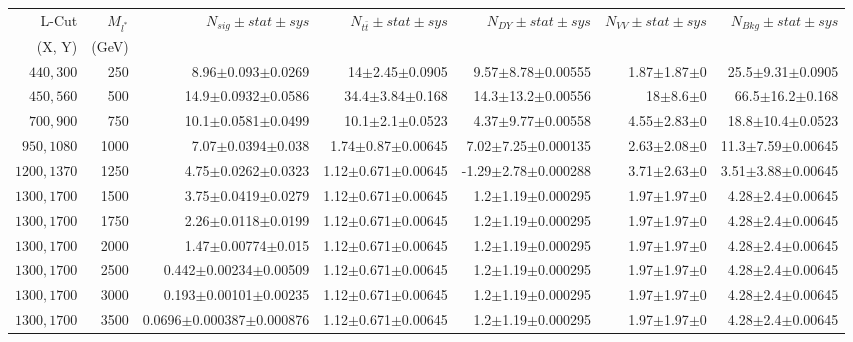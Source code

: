 \documentclass[]{article}
\begin{document}
\begin{table}
\begin{center}
\scriptsize{
\begin{tabular}{ |r|r|r|r|r|r|r|}
\hline 
L-Cut & $M_{l^*}$ & $N_{sig}\pm stat \pm sys $ &$N_{t\bar{t}}\pm stat \pm sys $ & $N_{DY}\pm stat \pm sys $ & $N_{VV}\pm stat \pm sys $ &$N_{Bkg}\pm stat \pm sys$\\
(X, Y) & (GeV) & && &&\\
\hline 
$440, 300$ & 250 & 8.96$\pm$0.093$\pm$0.0269 & 14$\pm$2.45$\pm$0.0905 & 9.57$\pm$8.78$\pm$0.00555 & 1.87$\pm$1.87$\pm$0 & 25.5$\pm$9.31$\pm$0.0905 \\
$450, 560$ & 500 & 14.9$\pm$0.0932$\pm$0.0586 & 34.4$\pm$3.84$\pm$0.168 & 14.3$\pm$13.2$\pm$0.00556 & 18$\pm$8.6$\pm$0 & 66.5$\pm$16.2$\pm$0.168 \\
$700, 900$ & 750 & 10.1$\pm$0.0581$\pm$0.0499 & 10.1$\pm$2.1$\pm$0.0523 & 4.37$\pm$9.77$\pm$0.00558 & 4.55$\pm$2.83$\pm$0 & 18.8$\pm$10.4$\pm$0.0523 \\
$950, 1080$ & 1000 & 7.07$\pm$0.0394$\pm$0.038 & 1.74$\pm$0.87$\pm$0.00645 & 7.02$\pm$7.25$\pm$0.000135 & 2.63$\pm$2.08$\pm$0 & 11.3$\pm$7.59$\pm$0.00645 \\
$1200, 1370$ & 1250 & 4.75$\pm$0.0262$\pm$0.0323 & 1.12$\pm$0.671$\pm$0.00645 & -1.29$\pm$2.78$\pm$0.000288 & 3.71$\pm$2.63$\pm$0 & 3.51$\pm$3.88$\pm$0.00645 \\
$1300, 1700$ & 1500 & 3.75$\pm$0.0419$\pm$0.0279 & 1.12$\pm$0.671$\pm$0.00645 & 1.2$\pm$1.19$\pm$0.000295 & 1.97$\pm$1.97$\pm$0 & 4.28$\pm$2.4$\pm$0.00645 \\
$1300, 1700$ & 1750 & 2.26$\pm$0.0118$\pm$0.0199 & 1.12$\pm$0.671$\pm$0.00645 & 1.2$\pm$1.19$\pm$0.000295 & 1.97$\pm$1.97$\pm$0 & 4.28$\pm$2.4$\pm$0.00645 \\
$1300, 1700$ & 2000 & 1.47$\pm$0.00774$\pm$0.015 & 1.12$\pm$0.671$\pm$0.00645 & 1.2$\pm$1.19$\pm$0.000295 & 1.97$\pm$1.97$\pm$0 & 4.28$\pm$2.4$\pm$0.00645 \\
$1300, 1700$ & 2500 & 0.442$\pm$0.00234$\pm$0.00509 & 1.12$\pm$0.671$\pm$0.00645 & 1.2$\pm$1.19$\pm$0.000295 & 1.97$\pm$1.97$\pm$0 & 4.28$\pm$2.4$\pm$0.00645 \\
$1300, 1700$ & 3000 & 0.193$\pm$0.00101$\pm$0.00235 & 1.12$\pm$0.671$\pm$0.00645 & 1.2$\pm$1.19$\pm$0.000295 & 1.97$\pm$1.97$\pm$0 & 4.28$\pm$2.4$\pm$0.00645 \\
$1300, 1700$ & 3500 & 0.0696$\pm$0.000387$\pm$0.000876 & 1.12$\pm$0.671$\pm$0.00645 & 1.2$\pm$1.19$\pm$0.000295 & 1.97$\pm$1.97$\pm$0 & 4.28$\pm$2.4$\pm$0.00645 \\

\end{tabular}}
\end{center}
\end{table}
\end{document}
